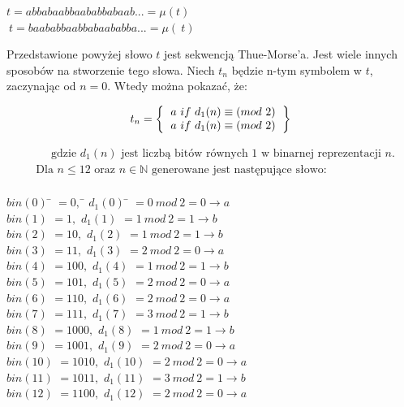 \documentclass[document]{xmgr}
\begin{document}
{\centering 
$t = abbabaabbaababbabaab... = \mu(t)$ \\
$~t = baababbaabbabaababba... = \mu(~t)$ 
\par}



Przedstawione powyżej słowo $t$ jest sekwencją Thue-Morse'a. Jest wiele innych sposobów na stworzenie tego słowa. Niech $t_n$ będzie n-tym symbolem w $t$, zaczynając od $n = 0$. Wtedy można pokazać, że:

\[
t_n=
\left \{
\begin{tabular}{ccc}
$a\ if\ d_1(n) \equiv (mod\ 2)$ \\
$a\ if\ d_1(n) \equiv (mod\ 2)$
\end{tabular}
\right \}
\]

\begin{align*}
  &\phantom{{}\leq{}} \text{gdzie } d_1(n) \text{ jest liczbą bitów równych 1 w binarnej reprezentacji } n \text{.}  \\
  & \text{Dla } n \leq 12 \text{ oraz } n \in \mathbb{N} \text{ generowane jest następujące słowo:}  \\
\end{align*}

\begin{tabbing}
$bin(0)$\hspace{1em} \= $= 0,$\hspace{7em} \= $d_1 (0)$\hspace{1em} \= $= 0\ mod\ 2 = 0 \to a$ \\
$bin(1)$ \> $= 1,$ \> $d_1 (1)$ \> $= 1\ mod\ 2 = 1 \to b$\\
$bin(2)$ \> $= 10,$ \> $d_1 (2)$ \> $= 1\ mod\ 2 = 1 \to b$\\
$bin(3)$ \> $= 11,$ \> $d_1 (3)$ \> $= 2\ mod\ 2 = 0 \to a$\\
$bin(4)$ \> $= 100,$ \> $d_1 (4)$ \> $= 1\ mod\ 2 = 1 \to b$\\
$bin(5)$ \> $= 101,$ \> $d_1 (5)$ \> $= 2\ mod\ 2 = 0 \to a$\\
$bin(6)$ \> $= 110,$ \> $d_1 (6)$ \> $= 2\ mod\ 2 = 0 \to a$\\
$bin(7)$ \> $= 111,$ \> $d_1 (7)$ \> $= 3\ mod\ 2 = 1 \to b$\\
$bin(8)$ \> $= 1000,$ \> $d_1 (8)$ \> $= 1\ mod\ 2 = 1 \to b$\\
$bin(9)$ \> $= 1001,$ \> $d_1 (9)$ \> $= 2\ mod\ 2 = 0 \to a$\\
$bin(10)$ \> $= 1010,$	\> $d_1 (10)$ \> $= 2\ mod\ 2 = 0 \to a$\\
$bin(11)$ \> $= 1011,$ 	\> $d_1 (11)$ \> $= 3\ mod\ 2 = 1 \to b$\\
$bin(12)$ \> $= 1100,$ 	\> $d_1 (12)$ \> $= 2\ mod\ 2 = 0 \to a$
\end{tabbing}
\end{document}
